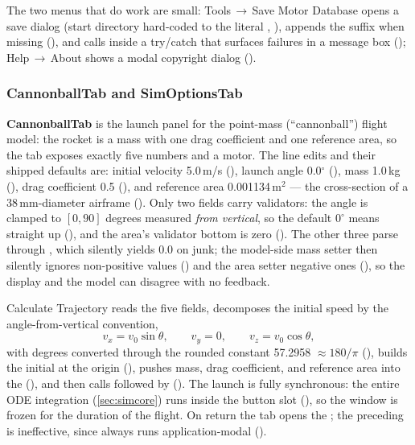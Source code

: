 The two menus that do work are small: Tools\,$\to$\,Save Motor Database opens a
 save dialog (start directory hard-coded to the literal ,
), appends the  suffix when missing
(), and calls  inside a try/catch that
surfaces failures in a message box (); Help\,$\to$\,About shows
a modal copyright dialog ().

\subsubsection{CannonballTab and SimOptionsTab}\label{sec:interfaces-gui-tabs}

\textbf{CannonballTab} is the launch panel for the point-mass (``cannonball'') flight model:
the rocket is a mass with one drag coefficient and one reference area, so the tab exposes
exactly five numbers and a motor. The line edits and their shipped defaults are: initial
velocity 5.0\,m/s (), launch angle 0.0$^\circ$
(), mass 1.0\,kg (), drag
coefficient 0.5 (), and reference area
0.001134\,$\mathrm{m^2}$ --- the cross-section of a 38\,mm-diameter airframe
(). Only two fields carry validators: the angle is clamped to
$[0,90]$ degrees measured \emph{from vertical}, so the default $0^\circ$ means straight up
(), and the area's validator bottom is zero
(). The other three parse through
, which silently yields 0.0 on junk; the model-side mass setter then
silently ignores non-positive values () and the area setter
negative ones (), so the display and the model can disagree with
no feedback.

Calculate Trajectory reads the five fields, decomposes the initial speed by the
angle-from-vertical convention,
\begin{equation}\label{eq:interfaces-angle}
v_x = v_0\sin\theta, \qquad v_y = 0, \qquad v_z = v_0\cos\theta,
\end{equation}
with degrees converted through the rounded constant 57.2958 $\approx 180/\pi$
(), builds the initial  at the origin
(), pushes mass, drag coefficient, and reference area into the
 (), and then calls
 followed by 
(). The launch is fully synchronous: the entire ODE
integration (\cref{sec:simcore}) runs inside the button slot
(), so the window is frozen for the duration of the flight. On return
the tab opens the ; the  preceding
 is ineffective, since  always runs application-modal
().

